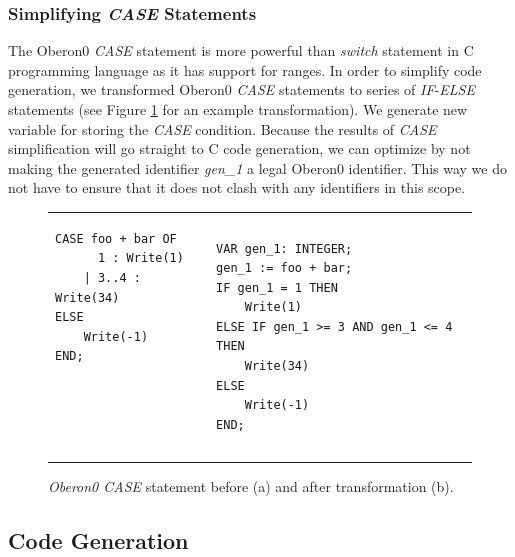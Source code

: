 \subsubsection{\label{sub:Simplifying-CASE-Statements}Simplifying \emph{CASE} Statements}

The Oberon0 \emph{CASE} statement is more powerful than \emph{switch}
statement in C programming language as it has support for ranges.
In order to simplify code generation, we transformed Oberon0 \emph{CASE}
statements to series of \emph{IF}-\emph{ELSE }statements (see Figure
\ref{fig:CASE-statement} for an example transformation). We generate
new variable for storing the \emph{CASE} condition. Because the results
of \emph{CASE} simplification will go straight to C code generation,
we can optimize by not making the generated identifier \emph{gen\_1}
a legal Oberon0 identifier. This way we do not have to ensure that
it does not clash with any identifiers in this scope.

%
\begin{figure}[!h]
\begin{tabular}{>{\centering}p{}>{\centering}p{}}
{\footnotesize }
\begin{lstlisting}[basicstyle={\footnotesize\ttfamily}]
CASE foo + bar OF
      1 : Write(1)
    | 3..4 : Write(34)
ELSE
    Write(-1)
END;
 
 
  
 
\end{lstlisting}
{\footnotesize \par}

\subfloat[\label{fig:case-before}]{} & {\footnotesize }
\begin{lstlisting}[basicstyle={\footnotesize\ttfamily}]
VAR gen_1: INTEGER;
gen_1 := foo + bar;
IF gen_1 = 1 THEN
    Write(1)
ELSE IF gen_1 >= 3 AND gen_1 <= 4 THEN
    Write(34)
ELSE
    Write(-1)
END;
\end{lstlisting}
{\footnotesize \par}

\subfloat[\label{fig:case-after}]{}\tabularnewline
\end{tabular}

\caption{\emph{\label{fig:CASE-statement}Oberon0 CASE} statement before (a)
and after transformation (b).}

\end{figure}



\subsection{Code Generation}

